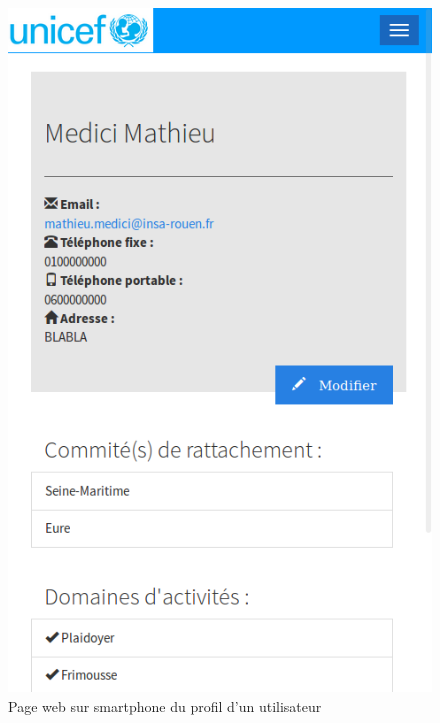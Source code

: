 \begin{frame}[plain]
\begin{figure}[!h]
	\begin{center}
	\includegraphics[scale=0.25]{images/profilSmartphone.png}
	\caption{Page web sur smartphone du profil d'un utilisateur}
	\end{center}
\end{figure}
\end{frame}